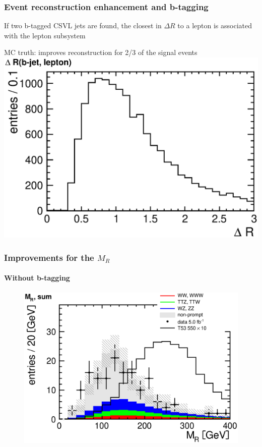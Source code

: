 \documentclass[ukenglish]{beamer}
\begin{document}
\begin{frame}
    \frametitle{Event reconstruction enhancement and b-tagging}
    \alert{If two b-tagged CSVL jets are found, the closest in $\Delta R$ to
    a lepton is associated with the lepton subsystem}

    \alert{MC truth: improves reconstruction for 2/3 of the signal events}
    \includegraphics[height=.5\textheight]{signal_mc_dr_jet_lepton.eps}
\end{frame}

\begin{frame}
    \frametitle{Improvements for the $M_R$}
    \framesubtitle{Without b-tagging}
        \begin{figure}[h!]
            \centering
                \includegraphics[height=.8\textheight]{mr_sum.eps}
        \end{figure}
\end{frame}
\end{document}
